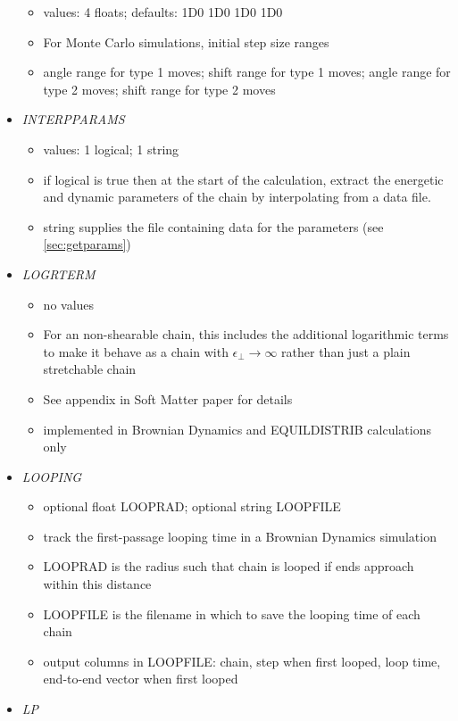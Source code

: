 \documentclass[12pt]{article}
\begin{document}
\begin{itemize}
  \begin{itemize}
    \item values: 4 floats; defaults: 1D0 1D0 1D0 1D0
    \item For Monte Carlo simulations, initial step size ranges
    \item angle range for type 1 moves; shift range for type 1 moves; angle range for type 2 moves; shift range for type 2 moves    
  \end{itemize}
%
\item {\it INTERPPARAMS}
  \begin{itemize}
    \item values: 1 logical; 1 string
    \item if logical is true then at the start of the calculation, extract the energetic and dynamic parameters of the chain by interpolating from a data file. 
    \item string supplies the file containing data for the parameters (see \ref{sec:getparams})
  \end{itemize}
%
\item {\it LOGRTERM}
  \begin{itemize}
    \item no values
    \item For an non-shearable chain, this includes the additional logarithmic terms to make it behave as a chain with $\epsilon_\perp\rightarrow \infty$ rather than just a plain stretchable chain
    \item See appendix in Soft Matter paper for details
    \item implemented in Brownian Dynamics and EQUILDISTRIB calculations only
  \end{itemize}
%
\item {\it LOOPING}
  \begin{itemize}
    \item optional float LOOPRAD; optional string LOOPFILE
    \item track the first-passage looping time in a Brownian Dynamics simulation
    \item LOOPRAD is the radius such that chain is looped if ends approach within this distance
    \item LOOPFILE is the filename in which to save the looping time of each chain 
    \item output columns in LOOPFILE: chain, step when first looped, loop time, end-to-end vector when first looped    
  \end{itemize}
%
\item {\it LP}

\end{itemize}
\end{document}
